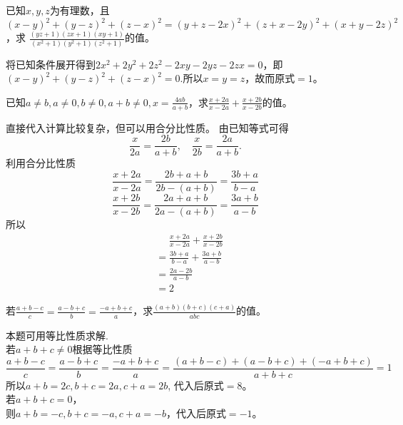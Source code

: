 \documentclass[windows,csize4]{BHCexam}
\begin{document}
\begin{groups}
\begin{questions}[]
\begin{solution}{0.5cm}
        \end{solution}
        \vspace{4.5cm}

        \question[5]  已知$x,y,z$为有理数，且$(x-y)^2+(y-z)^2+(z-x)^2=(y+z-2x)^2+(z+x-2y)^2+(x+y-2z)^2$，求
        $\frac{(yz+1)(zx+1)(xy+1)}{(x^2+1)(y^2+1)(z^2+1)}$的值。
        \begin{solution}{0.5cm}
            \methodonly 将已知条件展开得到$2x^2+2y^2+2z^2-2xy-2yz-2zx=0$，即$(x-y)^2+(y-z)^2+(z-x)^2=0$.所以$x=y=z$，故而原式$=1$。
        \end{solution}
        \vspace{4.5cm}

        \question[5]  已知$a\neq b, a\neq 0, b\neq 0, a+b\neq 0, x=\frac{4ab}{a+b}$，求$\frac{x+2a}{x-2a}+\frac{x+2b}{x-2b}$的值。
        \begin{solution}{0.5cm}
            \methodonly 直接代入计算比较复杂，但可以用合分比性质。
            由已知等式可得
            \[
                \frac{x}{2a}=\frac{2b}{a+b}, \quad \frac{x}{2b}=\frac{2a}{a+b}.    
            \]
            利用合分比性质
            \[
                \frac{x+2a}{x-2a}=\frac{2b+a+b}{2b-(a+b)}=\frac{3b+a}{b-a} 
            \]
            \[
                \frac{x+2b}{x-2b}=\frac{2a+a+b}{2a-(a+b)}=\frac{3a+b}{a-b}    
            \]
            所以
            \[
                \begin{aligned}
                    & \phantom{=}\frac{x+2a}{x-2a}+\frac{x+2b}{x-2b} \\
                    &= \frac{3b+a}{b-a} +\frac{3a+b}{a-b} \\
                    &= \frac{2a-2b}{a-b} \\ 
                    &= 2
                \end{aligned}
            \]

        \end{solution}
        \vspace{4.5cm}


        \question[5]  若$\frac{a+b-c}{c}=\frac{a-b+c}{b}=\frac{-a+b+c}{a}$，求$\frac{(a+b)(b+c)(c+a)}{abc}$的值。
        \begin{solution}{0.5cm}
            \methodonly 本题可用等比性质求解. \\
            若$a+b+c\neq 0$根据等比性质
            \[
                \frac{a+b-c}{c}=\frac{a-b+c}{b}=\frac{-a+b+c}{a}=\frac{(a+b-c)+(a-b+c)+(-a+b+c)}{a+b+c}=1
            \]
            所以$a+b=2c, b+c=2a, c+a=2b$, 代入后原式$=8$。\\
            若$a+b+c=0$，\\
            则$a+b=-c, b+c=-a, c+a=-b$，代入后原式$=-1$。
        \end{solution}

    \end{questions}
\end{groups}



\label{lastpage}
\end{document}

